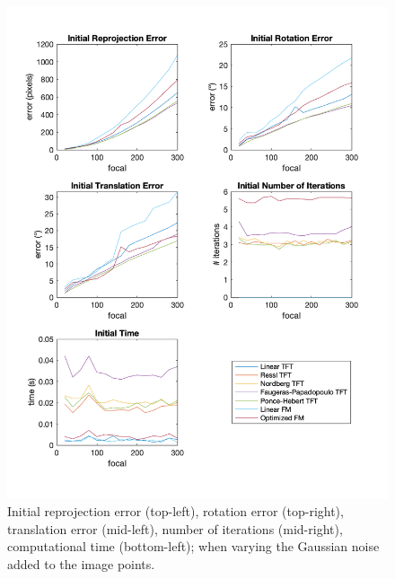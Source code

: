 \begin{figure}[p]
	\centering
	\includegraphics[width=1\textwidth]{Experiments/Synthetic/focal/INITfocalPlots.png}
	\caption{Initial reprojection error (top-left), rotation error (top-right), translation error (mid-left), number of iterations (mid-right), computational time (bottom-left); when varying the Gaussian noise added to the image points.}
	\label{fig:initFocalPlot}
\end{figure}

